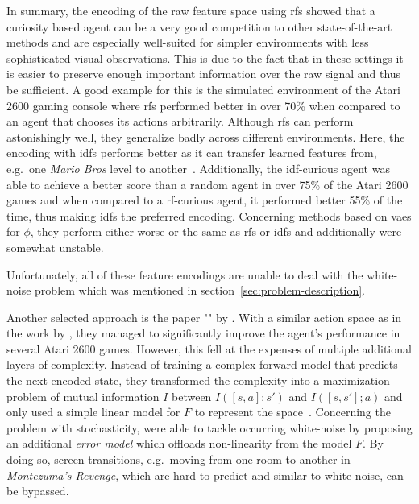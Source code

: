 \documentclass[draft,final]{vutinfth} %
\begin{document}

    In summary, the encoding of the raw feature space using \glspl{rf} showed that a curiosity based agent can be a very good competition to other state-of-the-art methods and are especially well-suited for simpler environments with less sophisticated visual observations.
    This is due to the fact that in these settings it is easier to preserve enough important information over the raw signal and thus be sufficient.
    A good example for this is the simulated environment of the Atari 2600 gaming console where \glspl{rf} performed better in over 70\% when compared to an agent that chooses its actions arbitrarily.
    Although \glspl{rf} can perform astonishingly well, they generalize badly across different environments.
    Here, the encoding with \glspl{idf} performs better as it can transfer learned features from, e.g.\ one \textit{Mario Bros} level to another~\citep{burda_large-scale_2018-1}.
    Additionally, the \gls{idf}-curious agent was able to achieve a better score than a random agent in over 75\% of the Atari 2600 games and when compared to a \gls{rf}-curious agent, it performed better 55\% of the time, thus making \glspl{idf} the preferred encoding.
    Concerning methods based on \glspl{vae} for $\phi$, they perform either worse or the same as \glspl{rf} or \glspl{idf} and additionally were somewhat unstable.

    Unfortunately, all of these feature encodings are unable to deal with the white-noise problem which was mentioned in section~\ref{sec:problem-description}.

    Another selected approach is the paper "" by \citet{kim_emi_2019}.
    With a similar action space as in the work by \citet{pathak_curiosity-driven_2017-1}, they managed to significantly improve the agent's performance in several Atari 2600 games.
    However, this fell at the expenses of multiple additional layers of complexity.
    Instead of training a complex forward model that predicts the next encoded state, they transformed the complexity into a maximization problem of mutual information $I$ between $I([s,a];s')$ and $I([s,s'];a)$ and only used a simple linear model for $F$ to represent the space~\citep{aubret_survey_2019}.
    Concerning the problem with stochasticity, \citet{kim_emi_2019} were able to tackle occurring white-noise by proposing an additional \textit{error model} which offloads non-linearity from the model $F$.
    By doing so, screen transitions, e.g.\ moving from one room to another in \textit{Montezuma's Revenge}, which are hard to predict and similar to white-noise, can be bypassed.
\end{document}
